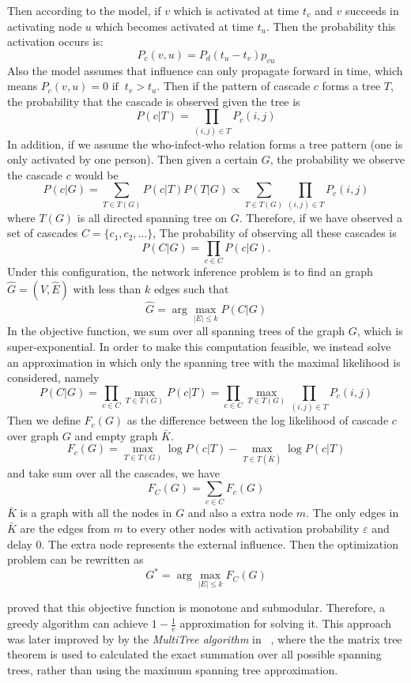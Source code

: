 Then according to the model, if $v$ which is activated at time $t_v$ and $v$ succeeds in activating node $u$ which becomes activated at time $t_u$. Then the probability this activation occurs is:
$$
P_c(v,u)=P_d(t_u-t_v)p_{vu}
$$
Also the model assumes that influence can only propagate forward in time, which means $
P_c(v,u)=0 \text{\ if\ }\ t_v>t_u.
$
Then if the pattern of cascade $c$ forms a tree $T$, the probability that the cascade is observed given the tree is
$$
P(c|T)=\prod_{(i,j)\in T}P_c(i,j)
$$
In addition, if we assume the who-infect-who relation forms a tree pattern (one is only activated by one person). Then given a certain $G$, the probability we observe the cascade $c$ would be
$$
P(c|G)=\sum_{T\in T(G)}P(c|T)P(T|G)\propto \sum_{T\in T(G)}\prod_{(i,j)\in T}P_c(i,j)
$$
where $T(G)$ is all directed spanning tree on $G$.
Therefore, if we have observed a set of cascades $C=\{c_1,c_2,\ldots\}$,
The probability of observing all these cascades is
$$
P(C|G)=\prod_{c\in C}P(c|G).
$$
Under this configuration, the network inference problem is to find an graph $\hat{G}=(V,\hat{E})$ with less than $k$ edges such that
$$
\hat{G} = \arg\max_{|E|\leq k} P(C|G)
$$
In the objective function, we sum over all spanning trees of the graph $G$, which is super-exponential. In order to make this computation feasible, we instead solve an approximation in which only the spanning tree with the maximal likelihood is considered, namely
$$
P(C|G)=\prod_{c\in C}\max_{T\in T(G)}P(c|T)=\prod_{c\in C}\max_{T\in T(G)}\prod_{(i,j)\in T}P_c(i,j)
$$
Then we define $F_c(G)$ as the difference between the log likelihood of cascade $c$ over graph $G$ and empty graph $\bar{K}$.
$$
F_c(G)=\max_{T\in T(G)}\log P(c|T)-\max_{T \in T(\bar{K})}\log P(c|T)
$$
and take sum over all the cascades, we have
$$
F_C(G)=\sum_{c\in C}F_c(G)
$$
$\bar{K}$ is a graph with all the nodes in $G$ and also a extra node $m$. The only edges in $\bar{K}$ are the edges from $m$ to every other nodes with activation probability $\varepsilon$ and delay $0$. The extra node represents the external influence. Then the optimization problem can be rewritten as
\begin{equation}\label{Equ:SubObj}
G^*=\arg\max_{|E|\leq k}F_C(G)
\end{equation}

\cite{GJA10} proved that this objective function is monotone and submodular. Therefore, a greedy algorithm can achieve $1-\frac{1}{e}$ approximation for solving it. This approach was later improved by by the \textit{MultiTree algorithm} in ~\cite{GB12}, where the the matrix tree theorem is used to calculated the exact summation over all possible spanning trees, rather than using the maximum spanning tree approximation.

